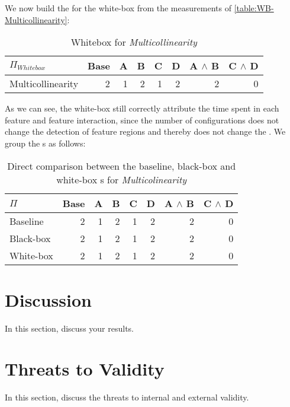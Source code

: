 We now build the \perfInfluenceModel for the white-box from the measurements of \autoref{table:WB-Multicollinearity}:

\begin{table}[H]
    \centering
    \begin{tabular}{lrrrrrrr}
    \toprule
    $\Pi_{Whitebox}$    & Base & A & B & C & D & A $\land$ B & C $\land$ D  \\
    \midrule
    Multicollinearity &   2 &  1 &  2 &  1 &  2 &   2 &  0 \\
    \bottomrule
    \end{tabular}
    \caption{Whitebox {\perfInfluenceModel} for \emph{Multicollinearity}}
\end{table}

As we can see, the white-box {\perfInfluenceModel} still correctly attribute the time spent in each feature and feature
interaction, since the number of configurations does not change the detection of feature regions and thereby does not 
change the \perfInfluenceModel. We group the {\perfInfluenceModel}s as follows:

\begin{table}[H]
    \centering
    \begin{tabular}{lrrrrrrr}
    \toprule
    $\Pi$    & Base & A & B & C & D & A $\land$ B & C $\land$ D  \\ \midrule
    Baseline & 2    & 1 & 2 & 1 & 2 & 2           & 0            \\
    Black-box & 2   & 1 & 2 & 1 & 2 & 2           & 0            \\
    White-box & 2   & 1 & 2 & 1 & 2 & 2           & 0            \\ \bottomrule
    \end{tabular}  
    \caption{Direct comparison between the baseline, black-box and white-box {\perfInfluenceModel}s for \emph{Multicolinearity}}
    \label{aggr:results-Multicollinearity}
\end{table}


\section{Discussion}\label{sec:discussion}

In this section, discuss your results.

\section{Threats to Validity}\label{sec:threats}

In this section, discuss the threats to internal and external validity.
